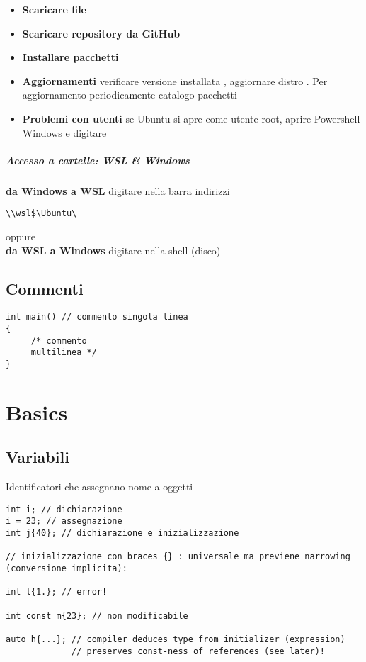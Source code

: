 \documentclass[10pt, oneside]{Book}
\begin{document}
\begin{itemize}
\item \textbf{Scaricare file}  
\item \textbf{Scaricare repository da GitHub} 
\item \textbf{Installare pacchetti} 

\item \textbf{Aggiornamenti} verificare versione installata , aggiornare distro . Per aggiornamento periodicamente catalogo pacchetti  

\item \textbf{Problemi con utenti} se Ubuntu si apre come utente root, aprire Powershell Windows e digitare 
\\
\end{itemize}

\paragraph{Accesso a cartelle: WSL \& Windows} \textbf{da Windows a WSL} digitare nella barra indirizzi \begin{verbatim}
\\wsl$\Ubuntu\
\end{verbatim}
oppure  
\\\textbf{da WSL a Windows} digitare nella shell \boxed{\texttt{cd /mnt/C/}} (disco)

\section{Commenti}
\begin{verbatim}
int main() // commento singola linea
{ 
     /* commento
     multilinea */
}
\end{verbatim}

\chapter{Basics}

\section{Variabili}
Identificatori che assegnano nome a oggetti
\\\begin{verbatim}
int i; // dichiarazione
i = 23; // assegnazione
int j{40}; // dichiarazione e inizializzazione

// inizializzazione con braces {} : universale ma previene narrowing (conversione implicita):

int l{1.}; // error!

int const m{23}; // non modificabile

auto h{...}; // compiler deduces type from initializer (expression)
             // preserves const-ness of references (see later)!
\end{verbatim}
\end{document}
